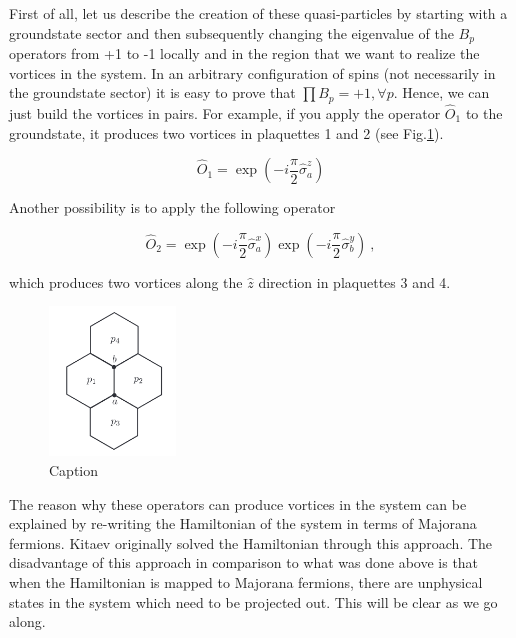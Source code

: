 \documentclass{article}
\begin{document}
First of all, let us describe the creation of these quasi-particles by starting with a groundstate sector and then subsequently changing the eigenvalue of the $B_p$ operators from +1 to -1 locally and in the region that we want to realize the vortices in the system. 
In an arbitrary configuration of spins (not necessarily in the groundstate sector) it is easy to prove that $\prod B_p = +1 ,\forall p$. Hence, we can just build the vortices in pairs. For example, if you apply the operator $\hat{O}_1$ to the groundstate,  it produces two vortices in plaquettes 1 and 2 (see Fig.\hspace{0.2mm}\ref{fig:anyons}). 

\begin{equation}\label{eq:18}
    \hat{O}_1 = \exp{(-i\frac{\pi}{2}\hat{\sigma}^{z}_a)}
\end{equation}{}

Another possibility is to apply the following operator 

\begin{equation}\label{eq:19}
    \hat{O}_2 = \exp{(-i\frac{\pi}{2}\hat{\sigma}^{x}_a)}\exp{(-i\frac{\pi}{2}\hat{\sigma}^{y}_b)}~,
\end{equation}{}

which produces two vortices along the $\hat{z}$ direction in plaquettes 3 and 4.

\begin{figure}[!htb]
    \centering
    \includegraphics[width=0.3\textwidth]{./images/anyons.png}
    \caption{Caption}
    \label{fig:anyons}
\end{figure}{}

The reason why these operators can produce vortices in the system can be explained by re-writing the Hamiltonian of the system in terms of Majorana fermions. Kitaev originally solved the Hamiltonian through this approach. The disadvantage of this approach in comparison to what was done above is that when the Hamiltonian is mapped to Majorana fermions, there are unphysical states in the system which need to be projected out. This will be clear as we go along.\\
\end{document}
